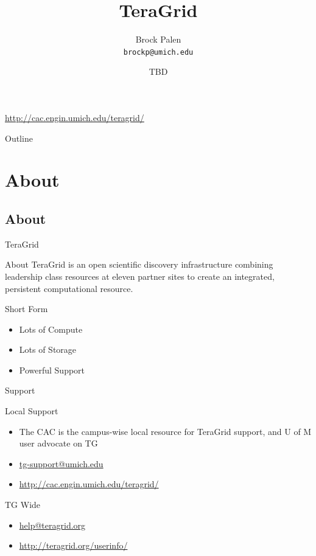 \documentclass[handout]{beamer}
\title[CAC Intro] {TeraGrid}
\author{Brock Palen\\ \texttt{brockp@umich.edu}}
\date{TBD}
\begin{document}
  \begin{frame}
    \titlepage
    \url{http://cac.engin.umich.edu/teragrid/}
  \end{frame}

  \begin{frame}{Outline}
    \tableofcontents
  \end{frame}
  
  \section{About}
  \subsection {About}
  \begin{frame}{TeraGrid}
   \begin{block}{About}
    TeraGrid is an open scientific discovery infrastructure combining leadership class resources at eleven partner sites to create an integrated, persistent computational resource.
   \end{block}
   \begin{block}{Short Form}
    \begin{itemize}
     \item<2-> Lots of Compute
     \item<3-> Lots of Storage
     \item<4-> Powerful Support
    \end{itemize}
   \end{block}
  \end{frame}

  \begin{frame}{Support}
   \begin{block}{Local Support}
    \begin{itemize}
     \item The CAC is the campus-wise local resource for TeraGrid support, and U of M user advocate on TG
     \item \url{tg-support@umich.edu}
     \item \url{http://cac.engin.umich.edu/teragrid/}
    \end{itemize}
   \end{block}
   \begin{block}{TG Wide}
    \begin{itemize}
     \item \url{help@teragrid.org}
     \item \url{http://teragrid.org/userinfo/}
    \end{itemize}
   \end{block}
  \end{frame}
\end{document}
